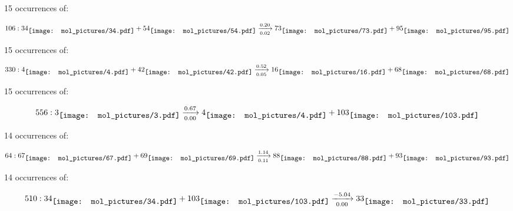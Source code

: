\documentclass{article}
\begin{document}
\vspace{1cm}


15 occurrences of:

$$
106:  
34
\raisebox{-.5\height}{\texttt{[image: mol\_pictures/34.pdf]}}
+
54
\raisebox{-.5\height}{\texttt{[image: mol\_pictures/54.pdf]}}
\xrightarrow[0.02]{0.20}
73
\raisebox{-.5\height}{\texttt{[image: mol\_pictures/73.pdf]}}
+
95
\raisebox{-.5\height}{\texttt{[image: mol\_pictures/95.pdf]}}
$$



\vspace{1cm}


15 occurrences of:

$$
330:  
4
\raisebox{-.5\height}{\texttt{[image: mol\_pictures/4.pdf]}}
+
42
\raisebox{-.5\height}{\texttt{[image: mol\_pictures/42.pdf]}}
\xrightarrow[0.05]{0.52}
16
\raisebox{-.5\height}{\texttt{[image: mol\_pictures/16.pdf]}}
+
68
\raisebox{-.5\height}{\texttt{[image: mol\_pictures/68.pdf]}}
$$



\vspace{1cm}


15 occurrences of:

$$
556:  
3
\raisebox{-.5\height}{\texttt{[image: mol\_pictures/3.pdf]}}
\xrightarrow[0.00]{0.67}
4
\raisebox{-.5\height}{\texttt{[image: mol\_pictures/4.pdf]}}
+
103
\raisebox{-.5\height}{\texttt{[image: mol\_pictures/103.pdf]}}
$$



\vspace{1cm}


14 occurrences of:

$$
64:  
67
\raisebox{-.5\height}{\texttt{[image: mol\_pictures/67.pdf]}}
+
69
\raisebox{-.5\height}{\texttt{[image: mol\_pictures/69.pdf]}}
\xrightarrow[0.11]{1.14}
88
\raisebox{-.5\height}{\texttt{[image: mol\_pictures/88.pdf]}}
+
93
\raisebox{-.5\height}{\texttt{[image: mol\_pictures/93.pdf]}}
$$



\vspace{1cm}


14 occurrences of:

$$
510:  
34
\raisebox{-.5\height}{\texttt{[image: mol\_pictures/34.pdf]}}
+
103
\raisebox{-.5\height}{\texttt{[image: mol\_pictures/103.pdf]}}
\xrightarrow[0.00]{-5.04}
33
\raisebox{-.5\height}{\texttt{[image: mol\_pictures/33.pdf]}}
$$
\end{document}
